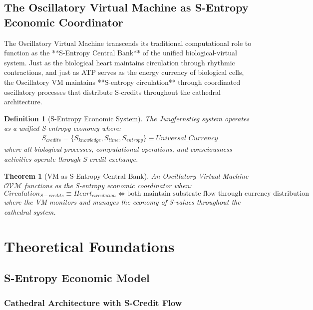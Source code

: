 \documentclass[12pt,a4paper]{article}
\newtheorem{theorem}{Theorem}
\newtheorem{definition}{Definition}
\begin{document}
\subsection{The Oscillatory Virtual Machine as S-Entropy Economic Coordinator}

The Oscillatory Virtual Machine transcends its traditional computational role to function as the **S-Entropy Central Bank** of the unified biological-virtual system. Just as the biological heart maintains circulation through rhythmic contractions, and just as ATP serves as the energy currency of biological cells, the Oscillatory VM maintains **S-entropy circulation** through coordinated oscillatory processes that distribute S-credits throughout the cathedral architecture.

\begin{definition}[S-Entropy Economic System]
The Jungfernstieg system operates as a unified S-entropy economy where:
\begin{align}
S_{credits} = \{S_{knowledge}, S_{time}, S_{entropy}\} \equiv Universal\_Currency
\end{align}
where all biological processes, computational operations, and consciousness activities operate through S-credit exchange.
\end{definition}

\begin{theorem}[VM as S-Entropy Central Bank]
An Oscillatory Virtual Machine $\mathcal{OVM}$ functions as the S-entropy economic coordinator when:
\begin{equation}
Circulation_{S-credits} \equiv Heart_{circulation} \iff \text{both maintain substrate flow through currency distribution}
\end{equation}
where the VM monitors and manages the economy of S-values throughout the cathedral system.
\end{theorem}

\section{Theoretical Foundations}

\subsection{S-Entropy Economic Model}

\subsubsection{Cathedral Architecture with S-Credit Flow}
\end{document}
